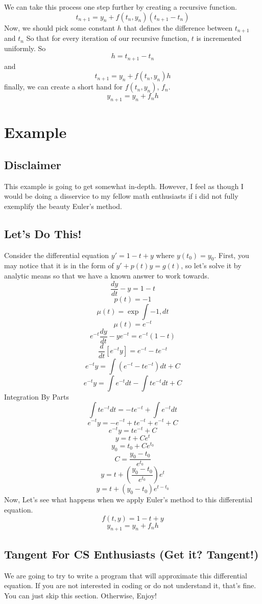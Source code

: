 \documentclass[font =22]{report}
\begin{document}
We can take this process one step further by creating a recursive function. 
\[
t_{n+1} = y_n + f(t_n,y_n)(t_{n+1} - t_n) 
\]  
Now, we should pick some constant $h$ that defines the difference between $t_{n+1}$ and $t_n$ So that for every iteration of our recursive function, $t$ is incremented uniformly. So 
\[
h = t_{n+1} - t_n
\] 
and 
\[
t_{n+1} = y_n + f(t_n,y_n)h
\]
finally, we can create a short hand for $f(t_n,y_n)$, $f_n$.
\[
y_{n+1} = y_n + f_nh
\]

\section*{Example}
\subsection*{Disclaimer}

This example is going to get somewhat in-depth. However, I feel as though I would be doing a disservice to my fellow math enthusiasts if i did not fully exemplify the beauty Euler's method.
\subsection*{Let's Do This!} 
Consider the differential equation $y'= 1-t+y$
where $y(t_0) = y_0$. First, you may notice that it is in the form of $y' +p(t)y = g(t)$, so let's solve it by analytic means so that we have a known answer to work towards.
\[
\frac{dy}{dt} - y = 1-t
\]
\[
p(t) = -1
\]
\[
\mu(t) = \exp{\int {-1} ,dt}
\]
\[
\mu(t) = e^{-t}
\]
\[
e^{-t}\frac{dy}{dt} - ye^{-t}= e^{-t}(1-t)
\]
\[
\frac{d}{dt}\left[e^{-t}y\right] = e^{-t}-te^{-t}
\]
\[
e^{-t}y = \int{(e^{-t}-te^{-t})}dt + C
\]
\[
e^{-t}y = \int {e^{-t}}dt - \int {te^{-t}} dt +C 
\]
Integration By Parts
\[
\int {te^{-t}} dt  = -te^{-t} + \int{e^{-t}}dt
\]
\[
e^{-t}y = -e^{-t} + te^{-t} + e^{-t} + C
\]
\[
e^{-t}y = te^{-t}  + C
\]
\[
y = t + Ce^t
\]
\[
y_0 = t_0 +Ce^{t_0}
\]
\[
C = \frac{y_0 - t_0}{e^{t_0}}
\]
\[
y= t + \left(  \frac{y_0 - t_0}{e^{t_0}} \right)e^t
\]
\[
y= t + (y_0 - t_0)e^{t-t_0}
\]
Now, Let's see what happens when we apply Euler's method to this differential equation.
\[
f(t,y) = 1 - t + y
\] 
\[
y_{n+1} = y_n + f_nh
\]


\subsection*{Tangent For CS Enthusiasts (Get it? Tangent!)}
We are going to try to write a program that will approximate this differential equation. If you are not interested in coding or do not understand it, that's fine. You can just skip this section. Otherwise, Enjoy! 
\end{document}
